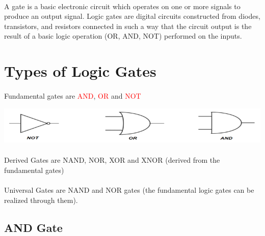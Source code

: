 \documentclass{article}
\begin{document}
\paragraph{}
A gate is a basic electronic circuit which operates on one or more signals to produce an output signal. 
Logic gates are digital circuits constructed from diodes, transistors, and resistors connected in such a way that the circuit output is the result of a basic logic operation (OR, AND, NOT) performed on the inputs.
\newpage
\section{Types of Logic Gates}
\paragraph{}
Fundamental gates are \textcolor{red}{AND}, \textcolor{red}{OR} and \textcolor{red}{NOT}

\includegraphics[width=1.0\linewidth]{Logicpic}

\paragraph{}
Derived Gates are NAND, NOR, XOR and XNOR (derived from the fundamental gates)
\paragraph{}
Universal Gates are NAND and NOR gates (the fundamental logic gates can be realized through them).

\subsection{AND Gate}
\end{document}
